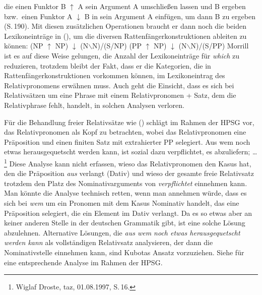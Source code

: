 die einen Funktor B $\uparrow$ A sein Argument A umschließen lassen und B ergeben bzw.\ einen Funktor A $\downarrow$
B in sein Argument A einfügen, um dann B zu ergeben (S.\,190). Mit diesen zusätzlichen Operationen
braucht er dann noch die beiden Lexikoneinträge in (), um die diversen
Rattenfängerkonstruktionen ableiten zu können:
\eal
\ex (NP $\uparrow$ NP) $\downarrow$ (N$\backslash$N)/(S/NP)
\ex (PP $\uparrow$ NP) $\downarrow$ (N$\backslash$N)/(S/PP)
\zl
Morrill ist es auf diese Weise gelungen, die Anzahl der Lexikoneinträge für \emph{which} zu
reduzieren, trotzdem bleibt der Fakt, dass er die Kategorien, die in Rattenfängerkonstruktionen
vorkommen können, im Lexikoneintrag des Relativpronomens erwähnen muss. 
Auch geht die Einsicht, dass es sich bei Relativsätzen um eine Phrase mit einem Relativpronomen
+ Satz, dem die Relativphrase fehlt, handelt, in solchen Analysen verloren.

Für die Behandlung freier Relativsätze wie () schlägt \citet[]{Kubota2002a} im
Rahmen der HPSG vor, das Relativpronomen als Kopf zu betrachten, wobei das Relativpronomen eine Präposition und einen finiten
Satz mit extrahierter PP selegiert.
\ea
Aus wem noch etwas herausgequetscht werden kann, ist sozial dazu verpflichtet, es abzuliefern; \ldots\footnote{
        Wiglaf Droste, taz, 01.08.1997, S.\,16.
      }
\z
Diese Analyse kann nicht erfassen, wieso das Relativpronomen den Kasus hat, den die Präposition
\emph{aus} verlangt (Dativ) und wieso der gesamte freie Relativsatz trotzdem den Platz des
Nominativarguments von \emph{verpflichtet} einnehmen kann. Man könnte die Analyse technisch retten,
wenn man annehmen würde, dass es sich bei \emph{wem} um ein Pronomen mit dem Kasus Nominativ handelt,
das eine Präposition selegiert, die ein Element im Dativ verlangt. Da es so etwas aber an keiner
anderen Stelle in der deutschen Grammatik gibt, ist eine solche Lösung abzulehnen. Alternative
Lösungen, die \emph{aus wem noch etwas herausgequetscht werden kann} als vollständigen Relativsatz
analysieren, der dann die Nominativstelle einnehmen kann, sind Kubotas Ansatz vorzuziehen. Siehe
 für eine entsprechende Analyse im Rahmen der HPSG.%


